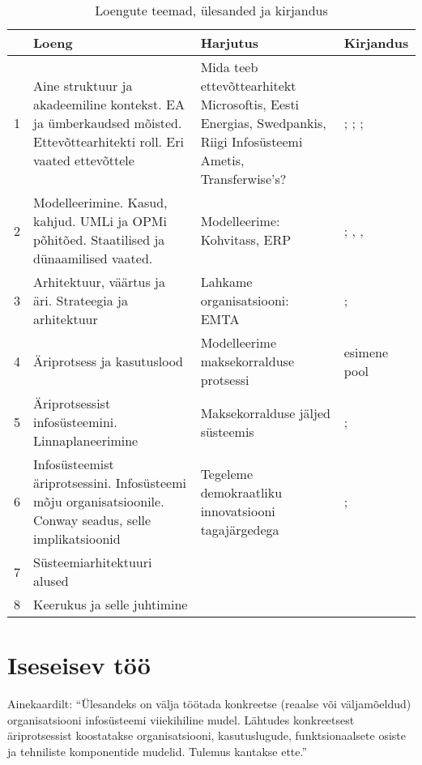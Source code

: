 \documentclass[nobib]{tufte-handout}
\begin{document}
\renewcommand{\arraystretch}{1.3}
\begin{table*}[ht]
\small
	\centering
	\selectfont
	\begin{tabular}{lp{5cm}p{6cm}p{4cm}}
		\toprule
		& Loeng & Harjutus & Kirjandus\\
		\midrule
		1 & Aine struktuur ja akadeemiline kontekst. EA ja ümberkaudsed mõisted. Ettevõttearhitekti roll. Eri vaated ettevõttele & Mida teeb ettevõttearhitekt Microsoftis, Eesti Energias, Swedpankis, Riigi Infosüsteemi Ametis, Transferwise's?  & \cite{parsons2005enterprise}; \cite{hickey}; \cite{sysengineering}; \cite{winter2006essential}\\
		2 & Modelleerimine. Kasud, kahjud. UMLi ja OPMi põhitõed. Staatilised ja dünaamilised vaated. & Modelleerime: Kohvitass, ERP & \cite{OPM}; \cite{heumann2005introduction}, \cite{box1976science}, \cite[peatükk 3]{ferenvcik2004survey}\\
		3 & Arhitektuur, väärtus ja äri. Strateegia ja arhitektuur & Lahkame organisatsiooni: EMTA & \cite{gadiesh2001transforming}; \cite{senge2002leader}\\
		4 & Äriprotsess ja kasutuslood & Modelleerime maksekorralduse protsessi & \cite{checkland2000soft} esimene pool \\
		5 & Äriprotsessist infosüsteemini. Linnaplaneerimine & Maksekorralduse jäljed süsteemis & \cite{wohed2006suitability}; \cite{bertin2014urbanization}\\
		6 & Infosüsteemist äriprotsessini. Infosüsteemi mõju organisatsioonile. Conway seadus, selle implikatsioonid & Tegeleme demokraatliku innovatsiooni tagajärgedega & \cite{conway1968committees}; \cite{maccormack2012exploring}\\
		7 & Süsteemiarhitektuuri alused & & \cite{crawley2015system}\\
		8 & Keerukus ja selle juhtimine & & \cite{holt2017so}\\
		\bottomrule
	\end{tabular}
	\caption{Loengute teemad, ülesanded ja kirjandus}
	\label{tab:content}
\end{table*}

\section{Iseseisev töö}
Ainekaardilt: \enquote{Ülesandeks on välja töötada konkreetse (reaalse või väljamõeldud) organisatsiooni infosüsteemi viiekihiline mudel. Lähtudes konkreetsest äriprotsessist koostatakse organisatsiooni, kasutuslugude, funktsionaalsete osiste ja tehniliste komponentide mudelid. Tulemus kantakse ette.}
\end{document}
